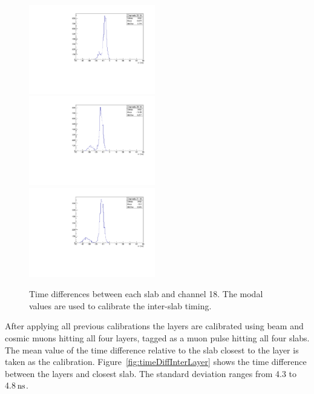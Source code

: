 \documentclass[12pt]{article}
\newcommand{\unit}[1]{\ensuremath{\text{\,#1}}\xspace}
\begin{document}
\begin{figure}
    \centering
    \includegraphics[width=0.49\textwidth]{figures/timingPlots/intraSlice/Channels_20_18.pdf}~
    \includegraphics[width=0.49\textwidth]{figures/timingPlots/intraSlice/Channels_28_18.pdf}\\
    \includegraphics[width=0.49\textwidth]{figures/timingPlots/intraSlice/Channels_21_18.pdf}
    \caption{\label{fig:timeDiffInterSlab} Time differences between each slab and channel 18. 
    The modal values are used to calibrate the inter-slab timing.}
\end{figure}

After applying all previous calibrations the layers are calibrated using beam and cosmic muons hitting all 
four layers, tagged as a muon pulse hitting all four slabs. The mean value of the time difference
relative to the slab closest to the layer is taken as the calibration. Figure~\ref{fig:timeDiffInterLayer}
shows the time difference between the layers and closest slab. The standard deviation ranges from
4.3 to 4.8\unit{ns}.
\end{document}
